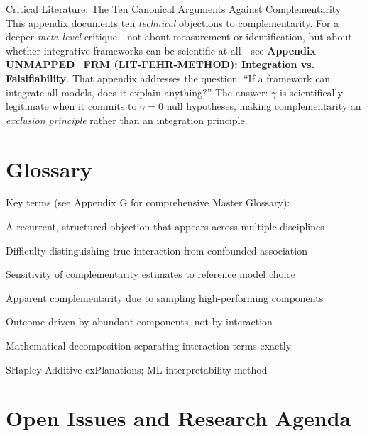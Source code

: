 \begin{chapter}{Critical Literature: The Ten Canonical Arguments Against Complementarity}
This appendix documents ten \textit{technical} objections to complementarity. For a
deeper \textit{meta-level} critique---not about measurement or identification, but
about whether integrative frameworks can be scientific at all---see \textbf{Appendix UNMAPPED_FRM
(LIT-FEHR-METHOD): Integration vs. Falsifiability}. That appendix addresses the
question: ``If a framework can integrate all models, does it explain anything?''
The answer: $\gamma$ is scientifically legitimate when it commits to $\gamma = 0$
null hypotheses, making complementarity an \textit{exclusion principle} rather than
an integration principle.

\section{Glossary}
\label{sec:glossary}

Key terms (see Appendix G for comprehensive Master Glossary):

\begin{description}[style=nextline]
    \item[Canonical Argument] A recurrent, structured objection that appears across multiple disciplines
    \item[Identification Problem] Difficulty distinguishing true interaction from confounded association
    \item[Model-Dependence] Sensitivity of complementarity estimates to reference model choice
    \item[Selection Effect] Apparent complementarity due to sampling high-performing components
    \item[Mass-Ratio Effect] Outcome driven by abundant components, not by interaction
    \item[Möbius Inversion] Mathematical decomposition separating interaction terms exactly
    \item[SHAP] SHapley Additive exPlanations; ML interpretability method
\end{description}

\section{Open Issues and Research Agenda}
\label{sec:crt-open-issues}


\end{chapter}
